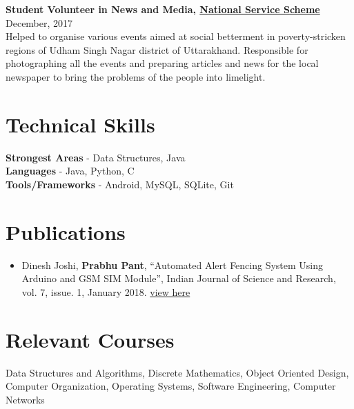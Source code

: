 \documentclass[margin, centered]{res}
\begin{document}
\begin{resume}
\textbf{Student Volunteer in News and Media, \href{http://nss.nic.in/}{National Service Scheme}} \hfill December, 2017\\
Helped to organise various events aimed at social betterment in poverty-stricken regions of Udham Singh Nagar district of Uttarakhand. Responsible for photographing all the events and preparing articles and news for the local newspaper to bring the problems of the people into limelight.\



\section{Technical \hspace{2mm} Skills}
\textbf{Strongest Areas} - Data Structures, Java \\
\textbf{Languages} - Java, Python, C\\
\textbf{Tools/Frameworks} - Android, MySQL, SQLite, Git


\section{Publications}
\begin{itemize}[leftmargin=*]
\item Dinesh Joshi, \textbf{Prabhu Pant}, ``Automated Alert Fencing System Using Arduino and GSM SIM Module'', Indian Journal of Science and Research, vol. 7, issue. 1, January 2018. \href{https://www.ijsr.net/archive/v7i1/ART20179526.pdf}{view here}
\end{itemize}



\section{Relevant \hspace{2mm}Courses}
Data Structures and Algorithms, Discrete Mathematics, Object Oriented Design, Computer Organization, Operating Systems, Software Engineering, Computer Networks


\end{resume}
\end{document}
